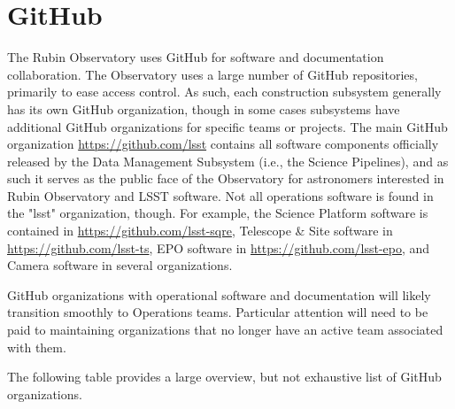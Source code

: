 \newpage
\section{GitHub}

The Rubin Observatory uses GitHub for software and documentation collaboration. \citep{GitHub-cite} The Observatory uses a large number of GitHub repositories, primarily to ease access control. As such, each construction subsystem generally has its own GitHub organization, though in some cases subsystems have additional GitHub organizations for specific teams or projects. The main GitHub organization \url{https://github.com/lsst} contains all software components officially released by the Data Management Subsystem (i.e., the Science Pipelines), and as such it serves as the public face of the Observatory for astronomers interested in Rubin Observatory and LSST software. Not all operations software is found in the "lsst" organization, though. For example, the Science Platform software is contained in \url{https://github.com/lsst-sqre}, Telescope \& Site software in \url{https://github.com/lsst-ts}, EPO software in \url{https://github.com/lsst-epo}, and Camera software in several organizations.

GitHub organizations with operational software and documentation will likely transition smoothly to Operations teams. Particular attention will need to be paid to maintaining organizations that no longer have an active team associated with them.

The following table provides a large overview, but not exhaustive list of GitHub organizations.

